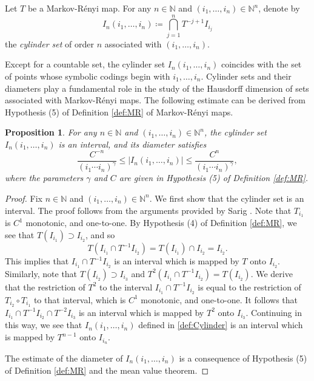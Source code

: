 \documentclass[12pt,reqno]{amsart}
\renewcommand{\=}{\coloneqq}
\theoremstyle{plain}
\newtheorem{proposition}[theorem]{Proposition}
\begin{document}
Let $ T$ be a Markov-R\'{e}nyi map. For any $n\in \mathbb N$ and $(i_1,\dots, i_n)\in \mathbb N^n$, denote by
\begin{equation}\label{def:Cylinder}
I_n(i_1,\dots,i_n) \coloneqq\bigcap_{j=1}^{n} T^{-j+1} I_{i_j}
\end{equation}
the \emph{cylinder set} of order $n$ associated with $(i_1,\dots, i_n)$.



Except for a countable set, the cylinder set $I_n(i_1,\dots,i_n)$ coincides with the set of points whose symbolic codings begin with $i_1,\dots, i_n$.
Cylinder sets and their diameters play a fundamental role in the study of the Hausdorff dimension of sets associated with Markov-R\'{e}nyi maps.
The following estimate can be derived from Hypothesis (5) of Definition \ref{def:MR} of Markov-R\'{e}nyi maps.

\begin{proposition}\label{p.cylinder}
For any $n\in \mathbb N$ and $(i_1,\dots, i_n)\in \mathbb N^n$, the cylinder set $I_n(i_1,\dots,i_n)$ is an interval, and its diameter satisfies
\begin{equation*}\label{e.cylinder}
   \frac{C^{-n}}{(i_1 \cdots i_{n})^{\gamma}}
   \leq |I_n(i_1,\dots,i_n)|
   \leq \frac{C^{n}}{(i_1 \cdots i_{n})^{\gamma}},
\end{equation*}
where the parameters $\gamma$ and $C$ are given in Hypothesis (5) of Definition \ref{def:MR}.
\end{proposition}

\begin{proof}
Fix $n\in \mathbb N$ and $(i_1,\dots, i_n)\in \mathbb N^n$. We first show that the cylinder set is an interval. The proof follows from the arguments provided by Sarig \cite[page 13]{Sar09}. Note that $T_{i_1}$ is $C^1$ monotonic, and one-to-one. By Hypothesis (4) of Definition \ref{def:MR}, we see that $T(I_{i_1}) \supset I_{i_2}$, and so
$$T(I_{i_1}\cap T^{-1}I_{i_2})=T(I_{i_1})\cap I_{i_2} =I_{i_2}.$$ This implies that $I_{i_1}\cap T^{-1}I_{i_2}$ is an interval which is mapped by $T$ onto $I_{i_2}$.
Similarly, note that $T(I_{i_2}) \supset I_{i_3}$ and $T^2(I_{i_1}\cap T^{-1}I_{i_2}) =T(I_{i_2})$. We derive that the restriction of $T^2$ to the interval $I_{i_1}\cap T^{-1}I_{i_2}$ is equal to the restriction of $T_{i_2} \circ T_{i_1}$ to that interval, which is $C^1$ monotonic, and one-to-one. It follows that $I_{i_1}\cap T^{-1}I_{i_2}\cap T^{-2}I_{i_3}$ is an interval which is mapped by $T^2$ onto $I_{i_3}$. Continuing in this way, we see that $I_n(i_1,\dots,i_n)$ defined in \eqref{def:Cylinder} is an interval which is mapped by $T^{n-1}$ onto $I_{i_n}$.

The estimate of the diameter of $I_n(i_1,\dots,i_n)$ is a consequence of Hypothesis (5) of Definition \ref{def:MR} and the mean value theorem.
\end{proof}
\end{document}
